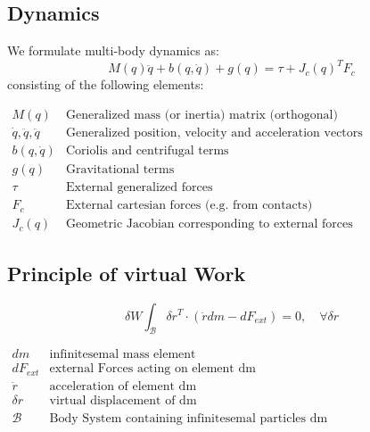 \documentclass[fontsize=6pt,DIV=calc,a4paper,ngerman]{scrartcl}
\begin{document}
\begin{multicols*}{4}
	\section{Dynamics}
	We formulate multi-body dynamics as:
	$$M(q)\ddot{q}+b(q,\dot{q})+g(q) = \tau + J_c(q)^T F_c$$
	consisting of the following elements:
	\begin{center}
		$\begin{array}{r|l}
				M(q)                      & \text{Generalized mass (or inertia) matrix (orthogonal)}       \\
				\dot{q},\ddot{q},\ddot{q} & \text{Generalized position, velocity and acceleration vectors} \\
				b(q,\dot{q})              & \text{Coriolis and centrifugal terms}                          \\
				g(q)                      & \text{Gravitational terms}                                     \\
				\tau                      & \text{External generalized forces}                             \\
				F_c                       & \text{External cartesian forces (e.g. from contacts)}          \\
				J_c(q)                    & \text{Geometric Jacobian corresponding to external forces}
			\end{array}$

	\end{center}

	\subsection{Principle of virtual Work}
	$$\delta W \int_\mathcal{B} \delta r^T \cdot (\ddot{r}dm-dF_{ext})=0, \quad \forall \delta r$$
	\begin{center}
		$\begin{array}{r|l}
				dm          & \text{infinitesemal mass element}                        \\
				dF_{ext}    & \text{external Forces acting on element dm}              \\
				\ddot{r}    & \text{acceleration of element dm}                        \\
				\delta r    & \text{virtual displacement of dm}                        \\
				\mathcal{B} & \text{Body System containing infinitesemal particles dm}
			\end{array}$


\end{center}
\end{multicols*}
\end{document}
